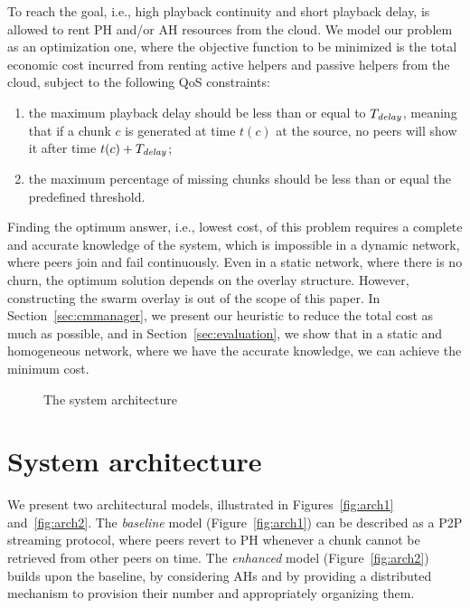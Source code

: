 To reach the \clive goal, i.e., high playback continuity and short playback delay, \clive is allowed to rent 
PH and/or AH resources from the cloud. 
We model our problem as an optimization one, where the objective function to be minimized is the total economic cost incurred from renting active helpers and passive helpers from the cloud, subject to the following QoS constraints:
\begin{enumerate}
\item the maximum playback delay should be less than or equal to $T_{\mathit{delay}}$,
meaning that if a chunk $c$ is generated at time $t(c)$ at the source, no
peers will show it after time $t(c)+T_{\mathit{delay}}$;
\item the maximum percentage of missing chunks should be less than or equal the predefined threshold.
\end{enumerate}

Finding the optimum answer, i.e., lowest cost, of this problem requires a complete and accurate knowledge of the system, which is impossible in a dynamic network, where peers join and fail continuously. Even in a static network, where there is no churn, the optimum solution depends on the overlay structure. However, constructing the swarm overlay is out of the scope of this paper. In Section~\ref{sec:cmmanager}, we present our heuristic to reduce the total cost as much as possible, and in Section~\ref{sec:evaluation}, we show that in a static and homogeneous network, where we have the accurate knowledge, we can achieve the minimum cost.

\begin{figure*}[t]
\centering
{}
\caption{\small The system architecture}\label{fig:arch}
\end{figure*}


\section{System architecture} \label{sec:system}
We present two architectural models, illustrated
in Figures~\ref{fig:arch1} and~\ref{fig:arch2}. The \emph{baseline} model
(Figure~\ref{fig:arch1}) can be described as a P2P streaming protocol, where
peers revert to PH whenever a chunk cannot be retrieved from other peers on time. The
\emph{enhanced} model (Figure~\ref{fig:arch2}) builds upon the baseline, by
considering AHs and by providing a distributed mechanism to provision their
number and appropriately organizing them. 

